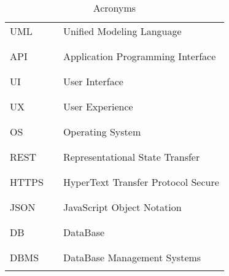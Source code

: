 \begin{table}[H]
\begin{tabular}{l l p{11cm}}
        UML               & \vline & Unified Modeling Language                              \\
                          &        &                                                        \\\hline \\
        API               & \vline & Application Programming Interface                      \\
                          &        &                                                        \\\hline \\
        UI                & \vline & User Interface                                         \\
                          &        &                                                        \\\hline \\
        UX                & \vline & User Experience                                        \\
                          &        &                                                        \\\hline \\
        OS                & \vline & Operating System                                       \\
                          &        &                                                        \\\hline \\
        REST              & \vline & Representational State Transfer                        \\
                          &        &                                                        \\\hline \\
        HTTPS             & \vline & HyperText Transfer Protocol Secure                     \\
                          &        &                                                        \\\hline \\
        JSON              & \vline & JavaScript Object Notation                             \\
                          &        &                                                        \\\hline \\
        DB                & \vline & DataBase                                               \\
                          &        &                                                        \\\hline \\
        DBMS              & \vline & DataBase Management Systems                            \\
                          &        &                                                        \\
        \hline
    \end{tabular}
    \caption{Acronyms}
\end{table}

